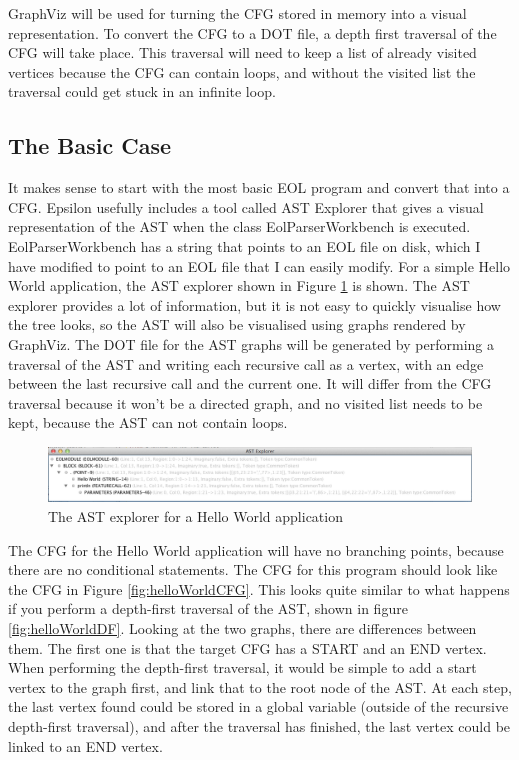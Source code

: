 GraphViz will be used for turning the CFG stored in memory into a visual representation. To convert the CFG to a DOT file, a depth first traversal of the CFG will take place. This traversal will need to keep a list of already visited vertices because the CFG can contain loops, and without the visited list the traversal could get stuck in an infinite loop.

\subsection{The Basic Case}

It makes sense to start with the most basic EOL program and convert that into a CFG. Epsilon usefully includes a tool called AST Explorer that gives a visual representation of the AST when the class EolParserWorkbench is executed. EolParserWorkbench has a string that points to an EOL file on disk, which I have modified to point to an EOL file that I can easily modify. For a simple Hello World application, the AST explorer shown in Figure \ref{fig:ASTExplorer} is shown. The AST explorer provides a lot of information, but it is not easy to quickly visualise how the tree looks, so the AST will also be visualised using graphs rendered by GraphViz. The DOT file for the AST graphs will be generated by performing a traversal of the AST and writing each recursive call as a vertex, with an edge between the last recursive call and the current one. It will differ from the CFG traversal because it won't be a directed graph, and no visited list needs to be kept, because the AST can not contain loops.

\begin{figure}
\centering
\includegraphics[width=\textwidth]{figures/ASTExplorer.png}
\caption{The AST explorer for a Hello World application}
\label{fig:ASTExplorer}
\end{figure}

The CFG for the Hello World application will have no branching points, because there are no conditional statements. The CFG for this program should look like the CFG in Figure \ref{fig:helloWorldCFG}. This looks quite similar to what happens if you perform a depth-first traversal of the AST, shown in figure \ref{fig:helloWorldDF}. Looking at the two graphs, there are differences between them. The first one is that the target CFG has a START and an END vertex. When performing the depth-first traversal, it would be simple to add a start vertex to the graph first, and link that to the root node of the AST. At each step, the last vertex found could be stored in a global variable (outside of the recursive depth-first traversal), and after the traversal has finished, the last vertex could be linked to an END vertex.

